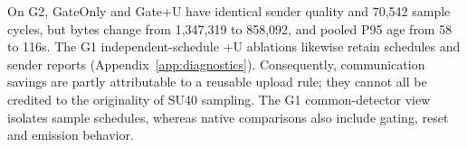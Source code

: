 On G2, GateOnly and Gate+U have identical sender quality and 70,542 sample cycles, but bytes change from 1,347,319 to 858,092, and pooled P95 age from 58 to 116s. The G1 independent-schedule +U ablations likewise retain schedules and sender reports (Appendix~\ref{app:diagnostics}). Consequently, communication savings are partly attributable to a reusable upload rule; they cannot all be credited to the originality of SU40 sampling. The G1 common-detector view isolates sample schedules, whereas native comparisons also include gating, reset and emission behavior.
